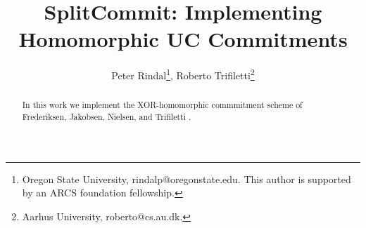\documentclass{article}
\begin{document}
	
	\title{SplitCommit: Implementing Homomorphic UC Commitments}
	
	
	\author{
		Peter Rindal\thanks{Oregon State University,  {\sf rindalp@oregonstate.edu}. This author is supported by an ARCS foundation fellowship.}, Roberto  Trifiletti\thanks{Aarhus University, {\sf roberto@cs.au.dk}.}
		}
		
		\maketitle

	
	\begin{abstract}
	In this work we implement the XOR-homomorphic commmitment scheme of Frederiksen, Jakobsen, Nielsen, and Trifiletti \cite{DBLP:conf/tcc/FrederiksenJNT16}.

	\end{abstract}
	
	
	\pagestyle{plain}
	
	
	
	
	
	
	
	
	
	
	
	
	
	
	
\end{document}

